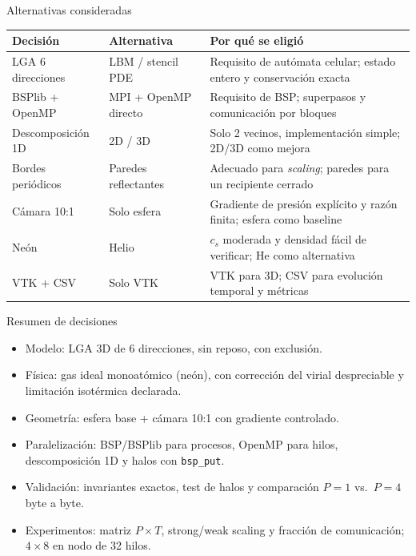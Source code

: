 \documentclass[aspectratio=169]{beamer}
\begin{document}
\begin{frame}{Alternativas consideradas}
  \centering
  \scriptsize
  \begin{tabular}{>{\raggedright\arraybackslash}p{3.2cm}>{\raggedright\arraybackslash}p{3.6cm}>{\raggedright\arraybackslash}p{6.2cm}}
    \toprule
    Decisión & Alternativa & Por qué se eligió \\
    \midrule
    LGA 6 direcciones & LBM / stencil PDE &
    Requisito de autómata celular; estado entero y conservación exacta \\
    BSPlib + OpenMP & MPI + OpenMP directo &
    Requisito de BSP; superpasos y comunicación por bloques \\
    Descomposición 1D & 2D / 3D &
    Solo 2 vecinos, implementación simple; 2D/3D como mejora \\
    Bordes periódicos & Paredes reflectantes &
    Adecuado para \emph{scaling}; paredes para un recipiente cerrado \\
    Cámara 10:1 & Solo esfera &
    Gradiente de presión explícito y razón finita; esfera como baseline \\
    Neón & Helio &
    $c_s$ moderada y densidad fácil de verificar; He como alternativa \\
    VTK + CSV & Solo VTK &
    VTK para 3D; CSV para evolución temporal y métricas \\
    \bottomrule
  \end{tabular}
\end{frame}

\begin{frame}{Resumen de decisiones}
  \begin{itemize}
    \item \alert{Modelo}: LGA 3D de 6 direcciones, sin reposo, con exclusión.
    \item \alert{Física}: gas ideal monoatómico (neón), con corrección del
          virial despreciable y limitación isotérmica declarada.
    \item \alert{Geometría}: esfera base + cámara 10:1 con gradiente
          controlado.
    \item \alert{Paralelización}: BSP/BSPlib para procesos, OpenMP para hilos,
          descomposición 1D y halos con \texttt{bsp\_put}.
    \item \alert{Validación}: invariantes exactos, test de halos y comparación
          $P=1$ vs.\ $P=4$ byte a byte.
    \item \alert{Experimentos}: matriz $P\times T$, strong/weak scaling y
          fracción de comunicación; $4\times8$ en nodo de 32 hilos.
  \end{itemize}
\end{frame}
\end{document}
